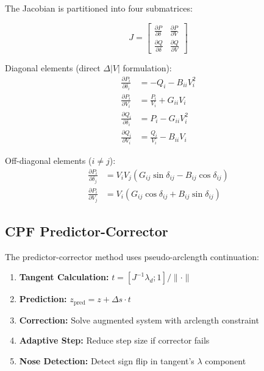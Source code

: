 \documentclass[12pt,a4paper]{article}
\begin{document}
The Jacobian is partitioned into four submatrices:

\begin{equation}
J = \begin{bmatrix}
\frac{\partial P}{\partial \delta} & \frac{\partial P}{\partial V} \\
\frac{\partial Q}{\partial \delta} & \frac{\partial Q}{\partial V}
\end{bmatrix}
\end{equation}

Diagonal elements (direct $\Delta|V|$ formulation):
\begin{align}
\frac{\partial P_i}{\partial \delta_i} &= -Q_i - B_{ii}V_i^2 \\
\frac{\partial P_i}{\partial V_i} &= \frac{P_i}{V_i} + G_{ii}V_i \\
\frac{\partial Q_i}{\partial \delta_i} &= P_i - G_{ii}V_i^2 \\
\frac{\partial Q_i}{\partial V_i} &= \frac{Q_i}{V_i} - B_{ii}V_i
\end{align}

Off-diagonal elements ($i \neq j$):
\begin{align}
\frac{\partial P_i}{\partial \delta_j} &= V_i V_j (G_{ij} \sin \delta_{ij} - B_{ij} \cos \delta_{ij}) \\
\frac{\partial P_i}{\partial V_j} &= V_i (G_{ij} \cos \delta_{ij} + B_{ij} \sin \delta_{ij})
\end{align}

\subsection{CPF Predictor-Corrector}

The predictor-corrector method uses pseudo-arclength continuation:

\begin{enumerate}
    \item \textbf{Tangent Calculation:} $t = [J^{-1} \lambda_d; 1] / \| \cdot \|$
    \item \textbf{Prediction:} $z_{\text{pred}} = z + \Delta s \cdot t$
    \item \textbf{Correction:} Solve augmented system with arclength constraint
    \item \textbf{Adaptive Step:} Reduce step size if corrector fails
    \item \textbf{Nose Detection:} Detect sign flip in tangent's $\lambda$ component
\end{enumerate}
\end{document}
